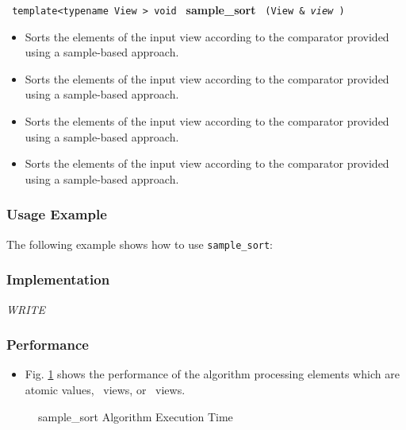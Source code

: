 \noindent
\texttt{%
template<typename View >
\newline
void 
}
\newline
\textbf{sample\_sort}%
\texttt{%
(View \&
\textit{view}%
)
}

\begin{itemize}
\item
Sorts the elements of the input view according to the comparator provided using a sample-based approach. 
\item
Sorts the elements of the input view according to the comparator provided using a sample-based approach. 
\item
Sorts the elements of the input view according to the comparator provided using a sample-based approach. 
\item
Sorts the elements of the input view according to the comparator provided using a sample-based approach. 
\end{itemize}

\subsubsection{Usage Example} %

The following example shows how to use \texttt{sample\_sort}:

 
\subsubsection{Implementation} %

\textit{WRITE}

\subsubsection{Performance} %

\begin{itemize}
\item
Fig. \ref{fig:sample-sort-alg-exec-exper}
shows the performance of the algorithm processing
elements which are atomic values, \stl\ views, or \stapl\ views.
\end{itemize}

\begin{figure}[p]
\caption{sample\_sort Algorithm Execution Time}
\label{fig:sample-sort-alg-exec-exper}
\end{figure}

